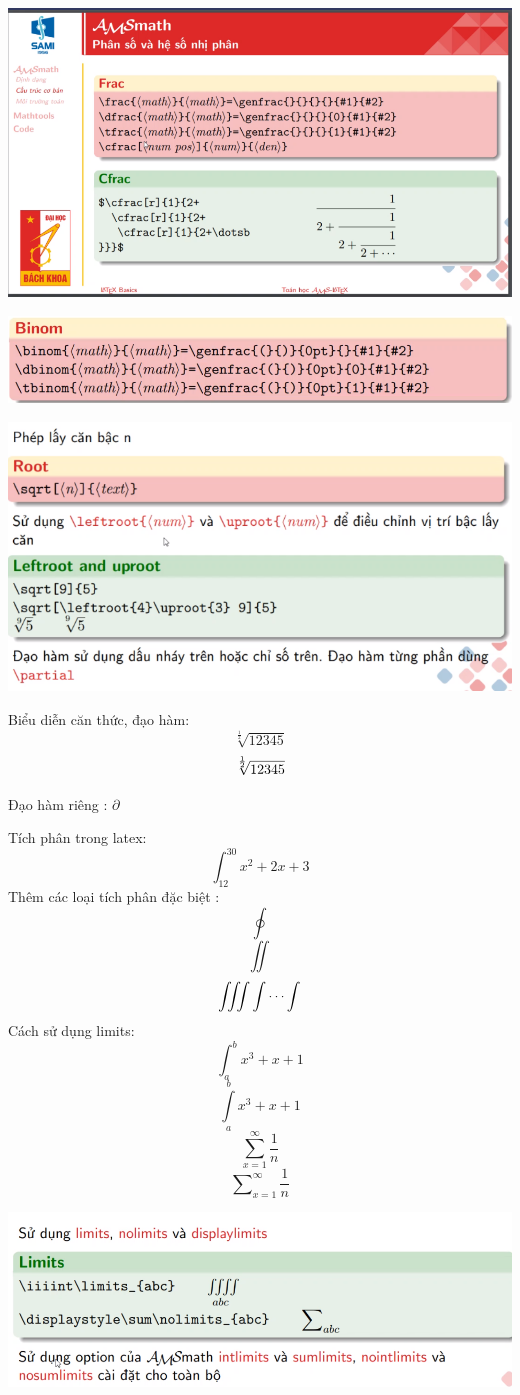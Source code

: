 \documentclass{article}
\begin{document}
\includegraphics[scale=0.6]{image/frac.png}

\includegraphics[scale=0.6]{image/binom.png}

\includegraphics[scale=0.6]{image/root.png}

Biểu diễn căn thức, đạo hàm:
$$ \sqrt[\frac{1}{2}]{12345}$$ 
$$ \sqrt[\uproot{4} \frac{1}{2}]{12345}$$ 

Đạo hàm riêng : $\partial$

Tích phân trong latex:
$$ \int_{12}^{30} x^2+2x+3$$
Thêm các loại tích phân đặc biệt :
$$ \oint $$
$$\iint$$ 
$$\iiint \idotsint $$
Cách sử dụng limits:
$$ \int_a^b x^3+x+1 $$
$$ \int\limits_a^b x^3+x+1 $$
$$ \sum_{x=1}^\infty \frac{1}{n}$$
$$ \sum\nolimits_{x=1}^\infty \frac{1}{n}$$

\includegraphics[scale=0.6]{image/limit.png}
\end{document}

